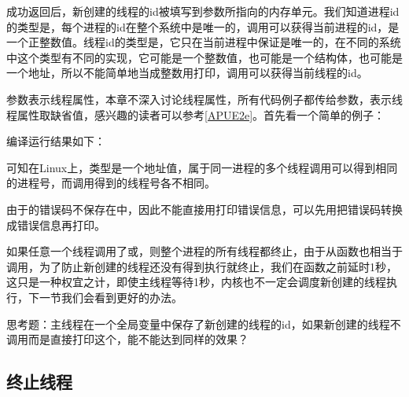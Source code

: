 成功返回后，新创建的线程的id被填写到参数所指向的内存单元。我们知道进程id的类型是，每个进程的id在整个系统中是唯一的，调用可以获得当前进程的id，是一个正整数值。线程id的类型是，它只在当前进程中保证是唯一的，在不同的系统中这个类型有不同的实现，它可能是一个整数值，也可能是一个结构体，也可能是一个地址，所以不能简单地当成整数用打印，调用可以获得当前线程的id。



参数表示线程属性，本章不深入讨论线程属性，所有代码例子都传给参数，表示线程属性取缺省值，感兴趣的读者可以参考\hyperlink{db.bi01.bibli.apue}{[APUE2e]}。首先看一个简单的例子：




编译运行结果如下：




可知在Linux上，类型是一个地址值，属于同一进程的多个线程调用可以得到相同的进程号，而调用得到的线程号各不相同。



由于的错误码不保存在中，因此不能直接用打印错误信息，可以先用把错误码转换成错误信息再打印。



如果任意一个线程调用了或，则整个进程的所有线程都终止，由于从函数也相当于调用，为了防止新创建的线程还没有得到执行就终止，我们在函数之前延时1秒，这只是一种权宜之计，即使主线程等待1秒，内核也不一定会调度新创建的线程执行，下一节我们会看到更好的办法。



思考题：主线程在一个全局变量中保存了新创建的线程的id，如果新创建的线程不调用而是直接打印这个，能不能达到同样的效果？


\subsection{终止线程}
%


